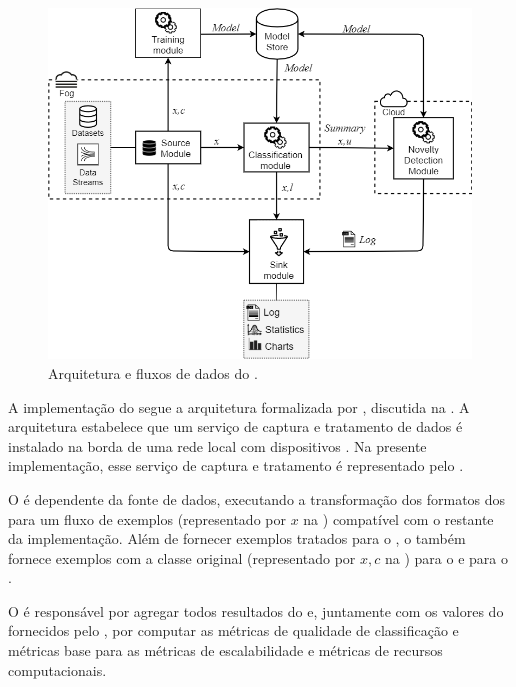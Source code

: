 \begin{figure}[hbt]
\centering
\includegraphics[width=\textwidth]{figuras/mfog.png}
\caption{Arquitetura e fluxos de dados do \mfog.}
\label{fig:arch}
\end{figure}

A implementação do \mfog segue a arquitetura \idsiot formalizada por
, discutida na .
A arquitetura \idsiot
estabelece que um serviço de
captura e tratamento de dados é instalado na borda de uma rede local com
dispositivos \iot.
Na presente implementação, esse serviço de captura e tratamento é representado
pelo \source.

O \source é dependente da fonte de dados, executando a transformação dos
formatos dos \datasets para um fluxo de exemplos (representado por $x$ na )
compatível com o restante da implementação.
Além de fornecer exemplos tratados para o \classify, o \source também fornece
exemplos com a classe original (representado por $x,c$ na )
para o \sink e para o \offline.

O \sink é responsável por agregar todos resultados do \mfog e,
juntamente com os valores do \dataset fornecidos pelo \source, por computar
as métricas de qualidade de classificação e métricas base para as métricas de
escalabilidade e métricas de recursos computacionais.


